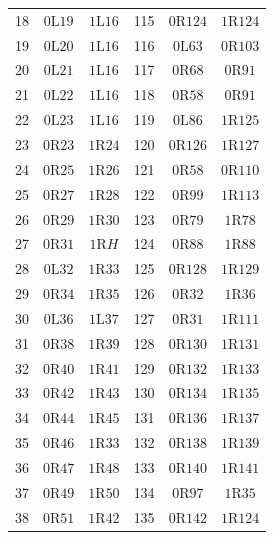 \begin{longtable}{@{}rcc@{\qquad\qquad}rcc@{}}
18 & $0\mathrm{L}19$ & $1\mathrm{L}16$ & 115 & $0\mathrm{R}124$ & $1\mathrm{R}124$ \\
19 & $0\mathrm{L}20$ & $1\mathrm{L}16$ & 116 & $0\mathrm{L}63$ & $0\mathrm{R}103$ \\
20 & $0\mathrm{L}21$ & $1\mathrm{L}16$ & 117 & $0\mathrm{R}68$ & $0\mathrm{R}91$ \\
21 & $0\mathrm{L}22$ & $1\mathrm{L}16$ & 118 & $0\mathrm{R}58$ & $0\mathrm{R}91$ \\
22 & $0\mathrm{L}23$ & $1\mathrm{L}16$ & 119 & $0\mathrm{L}86$ & $1\mathrm{R}125$ \\
23 & $0\mathrm{R}23$ & $1\mathrm{R}24$ & 120 & $0\mathrm{R}126$ & $1\mathrm{R}127$ \\
24 & $0\mathrm{R}25$ & $1\mathrm{R}26$ & 121 & $0\mathrm{R}58$ & $0\mathrm{R}110$ \\
25 & $0\mathrm{R}27$ & $1\mathrm{R}28$ & 122 & $0\mathrm{R}99$ & $1\mathrm{R}113$ \\
26 & $0\mathrm{R}29$ & $1\mathrm{R}30$ & 123 & $0\mathrm{R}79$ & $1\mathrm{R}78$ \\
27 & $0\mathrm{R}31$ & $1\mathrm{R}H$ & 124 & $0\mathrm{R}88$ & $1\mathrm{R}88$ \\
28 & $0\mathrm{L}32$ & $1\mathrm{R}33$ & 125 & $0\mathrm{R}128$ & $1\mathrm{R}129$ \\
29 & $0\mathrm{R}34$ & $1\mathrm{R}35$ & 126 & $0\mathrm{R}32$ & $1\mathrm{R}36$ \\
30 & $0\mathrm{L}36$ & $1\mathrm{L}37$ & 127 & $0\mathrm{R}31$ & $1\mathrm{R}111$ \\
31 & $0\mathrm{R}38$ & $1\mathrm{R}39$ & 128 & $0\mathrm{R}130$ & $1\mathrm{R}131$ \\
32 & $0\mathrm{R}40$ & $1\mathrm{R}41$ & 129 & $0\mathrm{R}132$ & $1\mathrm{R}133$ \\
33 & $0\mathrm{R}42$ & $1\mathrm{R}43$ & 130 & $0\mathrm{R}134$ & $1\mathrm{R}135$ \\
34 & $0\mathrm{R}44$ & $1\mathrm{R}45$ & 131 & $0\mathrm{R}136$ & $1\mathrm{R}137$ \\
35 & $0\mathrm{R}46$ & $1\mathrm{R}33$ & 132 & $0\mathrm{R}138$ & $1\mathrm{R}139$ \\
36 & $0\mathrm{R}47$ & $1\mathrm{R}48$ & 133 & $0\mathrm{R}140$ & $1\mathrm{R}141$ \\
37 & $0\mathrm{R}49$ & $1\mathrm{R}50$ & 134 & $0\mathrm{R}97$ & $1\mathrm{R}35$ \\
38 & $0\mathrm{R}51$ & $1\mathrm{R}42$ & 135 & $0\mathrm{R}142$ & $1\mathrm{R}124$ \\

\end{longtable}
